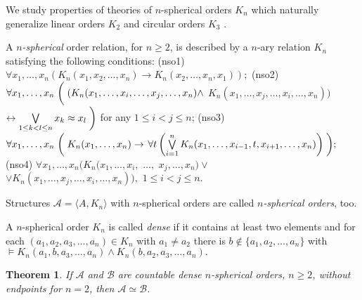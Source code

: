 \documentclass[bsl,meeting]{asl}
\def\urladdr#1{\endgraf\noindent{\it URL Address}: {\tt #1}.}
\newtheorem{theorem}{Theorem}
\newcommand{\NP}{}
\begin{document}
\thispagestyle{empty}


\NP {} 


 



\noindent


We study properties of theories of $n$-spherical orders $K_n$
\cite{aafot, ananat} which naturally generalize linear orders
$K_2$ and circular orders $K_3$ \cite{KulMac, Kulp3, Kulp4}.

A {\em $n$-spherical} order relation, for $n\geq 2$, is described
by a $n$-ary relation $K_n$ satisfying the following conditions:
 (nso1) $\forall x_1,\ldots,x_n (K_n(x_1,x_2,\ldots,x_n)\to K_n(x_2,\ldots,x_n,x_1));$
 (nso2) $\forall x_1,\ldots,x_n
 \biggm((K_n(x_1,\ldots,x_i,\ldots,x_j,\ldots,x_n)\land$
 $K_n(x_1,\ldots,x_j,\ldots,x_i,\ldots,x_n))$ $\leftrightarrow\bigvee\limits_{1\leq k<l\leq n} x_k\approx x_l\biggm)$ for any $1\leq i<j\leq n$;
 (nso3) $\forall x_1,\ldots,x_n\biggm(K_n(x_1,\ldots,x_n)\to$
 $\forall t\left(\bigvee\limits_{i=1}^nK_n(x_1,\ldots,x_{i-1},t,x_{i+1},\ldots,x_n)\right)\biggm);$
 (nso4) $\forall x_1,\ldots,x_n (K_n(x_1,\ldots,x_i,$ $\ldots,$ $x_j,\ldots,x_n)\lor$
 $\lor K_n(x_1,\ldots,x_j,\ldots,x_i,\ldots,x_n)),\,\, 1\leq i<j\leq
 n.$

Structures $\mathcal{A}=\langle A,K_n\rangle$ with $n$-spherical
orders are called {\em $n$-spherical orders}, too.

A $n$-spherical order $K_n$ is called {\em dense} if it contains
at least two elements and for each $(a_1,a_2,a_3,\ldots,a_n)\in
K_n$ with $a_1\ne a_2$ there is $b\notin\{a_1,a_2,\ldots,a_n\}$
with
$
\models K_n(a_1,b,a_3,\ldots,a_n)\wedge K_n(b,a_2,a_3,\ldots,a_n).
$

\begin{theorem}\label{th_dense_isom}
If $\mathcal{A}$ and $\mathcal{B}$ are countable dense
$n$-spherical orders, $n\geq 2$, without endpoints for $n=2$, then
$\mathcal{A}\simeq\mathcal{B}$.
\end{theorem}
\end{document}
